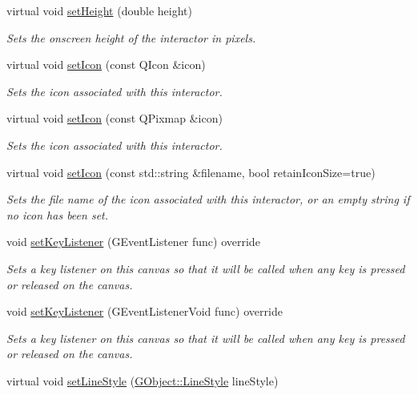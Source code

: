 \begin{DoxyCompactItemize}
virtual void \mbox{\hyperlink{classGInteractor_a9e280bfc4544dfaf8e4376c4e1a74357}{set\+Height}} (double height)
\begin{DoxyCompactList}\small\item\em Sets the onscreen height of the interactor in pixels. \end{DoxyCompactList}\item 
virtual void \mbox{\hyperlink{classGInteractor_a542abfcd7261751352af129c7215ecda}{set\+Icon}} (const Q\+Icon \&icon)
\begin{DoxyCompactList}\small\item\em Sets the icon associated with this interactor. \end{DoxyCompactList}\item 
virtual void \mbox{\hyperlink{classGInteractor_a368e1a338f84401c284506d03b1ba769}{set\+Icon}} (const Q\+Pixmap \&icon)
\begin{DoxyCompactList}\small\item\em Sets the icon associated with this interactor. \end{DoxyCompactList}\item 
virtual void \mbox{\hyperlink{classGInteractor_a762e139aa311461c3984d3ad28293f64}{set\+Icon}} (const std\+::string \&filename, bool retain\+Icon\+Size=true)
\begin{DoxyCompactList}\small\item\em Sets the file name of the icon associated with this interactor, or an empty string if no icon has been set. \end{DoxyCompactList}\item 
void \mbox{\hyperlink{classGCanvas_a53809ec015da5bf9fad5e7a11b218993}{set\+Key\+Listener}} (G\+Event\+Listener func) override
\begin{DoxyCompactList}\small\item\em Sets a key listener on this canvas so that it will be called when any key is pressed or released on the canvas. \end{DoxyCompactList}\item 
void \mbox{\hyperlink{classGCanvas_a1320ed9889a730dfead04a334463ecf3}{set\+Key\+Listener}} (G\+Event\+Listener\+Void func) override
\begin{DoxyCompactList}\small\item\em Sets a key listener on this canvas so that it will be called when any key is pressed or released on the canvas. \end{DoxyCompactList}\item 
virtual void \mbox{\hyperlink{classGDrawingSurface_a6bfe14a77101db0fb97b5a7e07a5526b}{set\+Line\+Style}} (\mbox{\hyperlink{classGObject_a86e0f5648542856159bb40775c854aa7}{G\+Object\+::\+Line\+Style}} line\+Style)

\end{DoxyCompactItemize}
